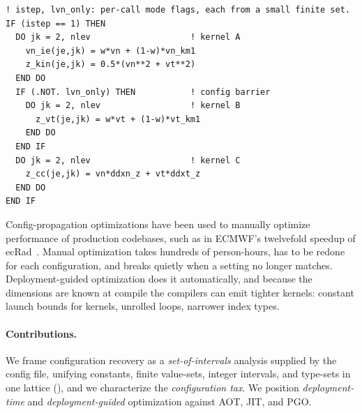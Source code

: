 \begin{lstlisting}[style=fortran,basicstyle=\ttfamily\footnotesize,float=t,caption={A configuration-dependent fusion barrier in ICON's \texttt{velocity\_tendencies} (distilled). The invocation arguments \texttt{istep} (dynamical-core stage) and \texttt{lvn\_only} (which velocity tendencies to compute) are fixed within a call but unknown to the compiler, which keeps kernels \texttt{A}--\texttt{C} unfused. Each ranges over a small finite set.},label={lst:motivating}]
! istep, lvn_only: per-call mode flags, each from a small finite set.
IF (istep == 1) THEN
  DO jk = 2, nlev                    ! kernel A
    vn_ie(je,jk) = w*vn + (1-w)*vn_km1
    z_kin(je,jk) = 0.5*(vn**2 + vt**2)
  END DO
  IF (.NOT. lvn_only) THEN           ! config barrier
    DO jk = 2, nlev                  ! kernel B
      z_vt(je,jk) = w*vt + (1-w)*vt_km1
    END DO
  END IF
  DO jk = 2, nlev                    ! kernel C
    z_cc(je,jk) = vn*ddxn_z + vt*ddxt_z
  END DO
END IF
\end{lstlisting}

Config-propagation optimizations have been used to manually optimize performance of production codebases, such as in ECMWF's twelvefold speedup of ecRad~\cite{ecrad2024}. Manual optimization takes hundreds of person-hours, has to be redone for each configuration, and breaks quietly when a setting no longer matches. Deployment-guided optimization does it automatically, and because the dimensions are known at compile the compilers can emit tighter kernels: constant launch bounds for kernels, unrolled loops, narrower index types.


\paragraph{Contributions.}
We frame configuration recovery as a \emph{set-of-intervals} analysis supplied by the config file, unifying constants, finite value-sets, integer intervals, and type-sets in one lattice (), and we characterize the \emph{configuration tax}. We position \emph{deployment-time} and \emph{deployment-guided} optimization against AOT, JIT, and PGO.
  
